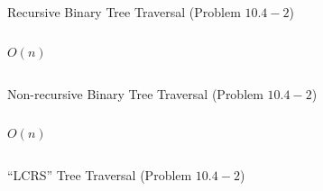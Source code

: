 
\begin{frame}{}
  \begin{exampleblock}{Recursive Binary Tree Traversal (Problem $10.4-2$)}
    \begin{columns}
	\[
	  O(n)
	\]

        \pause
	
    \end{columns}
  \end{exampleblock}
\end{frame}

\begin{frame}{}
  \begin{exampleblock}{Non-recursive Binary Tree Traversal (Problem $10.4-2$)}
    \begin{columns}
	\[
	  O(n)
	\]

        \pause
	
    \end{columns}
  \end{exampleblock}
\end{frame}

\begin{frame}{}
  \begin{exampleblock}{``LCRS'' Tree Traversal (Problem $10.4-2$)}
  \end{exampleblock}
\end{frame}
